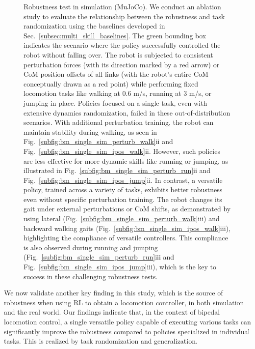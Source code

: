\begin{figure}[t]
\caption{Robustness test in simulation (MuJoCo). We conduct an ablation study to evaluate the relationship between the robustness and task randomization using the baselines developed in Sec.~\ref{subsec:multi_skill_baselines}. The green bounding box indicates the scenario where the policy successfully controlled the robot without falling over. The robot is subjected to consistent perturbation forces (with its direction marked by a red arrow) or CoM position offsets of all links (with the robot's entire CoM conceptually drawn as a red point) while performing fixed locomotion tasks like walking at 0.6 m/s, running at 3 m/s, or jumping in place. Policies focused on a single task, even with extensive dynamics randomization, failed in these out-of-distribution scenarios. With additional perturbation training, the robot can maintain stability during walking, as seen in Fig.~\ref{subfig:bm_single_sim_perturb_walk}ii and Fig.~\ref{subfig:bm_single_sim_ipos_walk}ii. However, such policies are less effective for more dynamic skills like running or jumping, as illustrated in Fig.~\ref{subfig:bm_single_sim_perturb_run}ii and Fig.~\ref{subfig:bm_single_sim_ipos_jump}ii.
In contrast, a versatile policy, trained across a variety of tasks, exhibits better robustness even without specific perturbation training. The robot changes its gait under external perturbations or CoM shifts, as demonstrated by using lateral (Fig.~\ref{subfig:bm_single_sim_perturb_walk}iii) and backward walking gaits (Fig.~\ref{subfig:bm_single_sim_ipos_walk}iii), highlighting the compliance of versatile controllers. This compliance is also observed during running and jumping (Fig.~\ref{subfig:bm_single_sim_perturb_run}iii and Fig.~\ref{subfig:bm_single_sim_ipos_jump}iii), which is the key to success in these challenging robustness tests.}
\label{fig:bm_single_sim}
\end{figure}




We now validate another key finding in this study, which is the source of robustness when using RL to obtain a locomotion controller, in both simulation and the real world. 
Our findings indicate that, in the context of bipedal locomotion control, a single versatile policy capable of executing various tasks can significantly improve the robustness compared to policies specialized in individual tasks. This is realized by task randomization and generalization.





